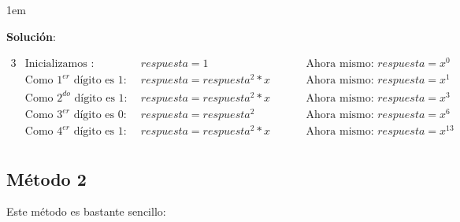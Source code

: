 \documentclass[12pt, fleqn]{report}                             %
\newenvironment{SmallIndentation}[1][0.75em]                    %
    {\begin{adjustwidth}{#1}{}\begin{footnotesize}}                 %
    {\end{footnotesize}\end{adjustwidth}}                           %
\DeclareMathOperator \Space {\quad}                             %
\begin{document}
            \begin{SmallIndentation}[1em]
                \textbf{Solución}:

                \begin{alignat*}{3}
                    &\text{Inicializamos : }                    
                        && respuesta = 1                        &&  \text{Ahora mismo: } respuesta = x^0  \\
                    &\text{Como $1^{er}$ dígito es 1:  } 
                        && respuesta = respuesta^2 * x          &&  \text{Ahora mismo: } respuesta = x^1  \\
                    &\text{Como $2^{do}$ dígito es 1:  }
                        && respuesta = respuesta^2 * x          &&  \text{Ahora mismo: } respuesta = x^3  \\
                    &\text{Como $3^{er}$ dígito es 0:  }
                        && respuesta = respuesta^2              &&  \text{Ahora mismo: } respuesta = x^6  \\
                    &\text{Como $4^{er}$ dígito es 1:  } \Space 
                        && respuesta = respuesta^2 * x   \Space &&  \text{Ahora mismo: } respuesta = x^{13} \\
                \end{alignat*}

            \end{SmallIndentation}

            


        \clearpage
        \subsection*{Método 2}

            Este método es bastante sencillo:
\end{document}

